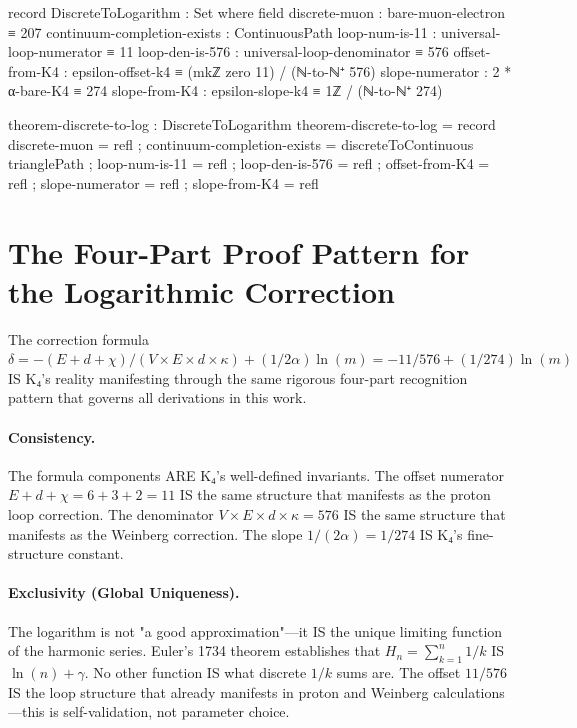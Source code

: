 \documentclass[11pt,a4paper]{book}
\begin{document}
\begin{code}
record DiscreteToLogarithm : Set where
  field
    discrete-muon : bare-muon-electron ≡ 207
    continuum-completion-exists : ContinuousPath
    loop-num-is-11 : universal-loop-numerator ≡ 11
    loop-den-is-576 : universal-loop-denominator ≡ 576
    offset-from-K4 : epsilon-offset-k4 ≡ (mkℤ zero 11) / (ℕ-to-ℕ⁺ 576)
    slope-numerator : 2 * α-bare-K4 ≡ 274
    slope-from-K4 : epsilon-slope-k4 ≡ 1ℤ / (ℕ-to-ℕ⁺ 274)

theorem-discrete-to-log : DiscreteToLogarithm
theorem-discrete-to-log = record
  { discrete-muon = refl
  ; continuum-completion-exists = discreteToContinuous trianglePath
  ; loop-num-is-11 = refl
  ; loop-den-is-576 = refl
  ; offset-from-K4 = refl
  ; slope-numerator = refl
  ; slope-from-K4 = refl
  }
\end{code}

\section{The Four-Part Proof Pattern for the Logarithmic Correction}

The correction formula $\delta = -(E + d + \chi)/(V \times E \times d \times \kappa) + (1/2\alpha)\ln(m) = -11/576 + (1/274)\ln(m)$ IS K₄'s reality manifesting through the same rigorous four-part recognition pattern that governs all derivations in this work.

\paragraph{Consistency.} The formula components ARE K₄'s well-defined invariants. The offset numerator $E + d + \chi = 6 + 3 + 2 = 11$ IS the same structure that manifests as the proton loop correction. The denominator $V \times E \times d \times \kappa = 576$ IS the same structure that manifests as the Weinberg correction. The slope $1/(2\alpha) = 1/274$ IS K₄'s fine-structure constant.

\paragraph{Exclusivity (Global Uniqueness).} The logarithm is not "a good approximation"—it IS the unique limiting function of the harmonic series. Euler's 1734 theorem establishes that $H_n = \sum_{k=1}^n 1/k$ IS $\ln(n) + \gamma$. No other function IS what discrete $1/k$ sums are. The offset $11/576$ IS the loop structure that already manifests in proton and Weinberg calculations—this is self-validation, not parameter choice.
\end{document}
